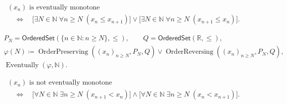 \begin{remark*}
\[
\begin{aligned}
&(x_n)\text{ is eventually monotone}\\
&\quad\Longleftrightarrow\quad
\bigl[\exists N\in\mathbb{N}\;\forall n\ge N\;(x_n\le x_{n+1})\bigr]
\lor
\bigl[\exists N\in\mathbb{N}\;\forall n\ge N\;(x_{n+1}\le x_n)\bigr].
\end{aligned}
\]
\end{remark*}

\begin{remark*}
\[
\begin{aligned}
&P_N=\mathsf{OrderedSet}(\{n\in\mathbb{N}:n\ge N\},\leq),\qquad
Q=\mathsf{OrderedSet}(\mathbb{R},\leq),\\
&\varphi(N)\coloneqq
\operatorname{OrderPreserving}((x_n)_{n\ge N},P_N,Q)
\lor
\operatorname{OrderReversing}((x_n)_{n\ge N},P_N,Q),\\
&\operatorname{Eventually}(\varphi,\mathbb{N}).
\end{aligned}
\]
\end{remark*}

\begin{remark*}
\[
\begin{aligned}
&(x_n)\text{ is not eventually monotone}\\
&\quad\Longleftrightarrow\quad
\bigl[\forall N\in\mathbb{N}\;\exists n\ge N\;(x_{n+1}<x_n)\bigr]
\land
\bigl[\forall N\in\mathbb{N}\;\exists n\ge N\;(x_n<x_{n+1})\bigr].
\end{aligned}
\]
\end{remark*}

